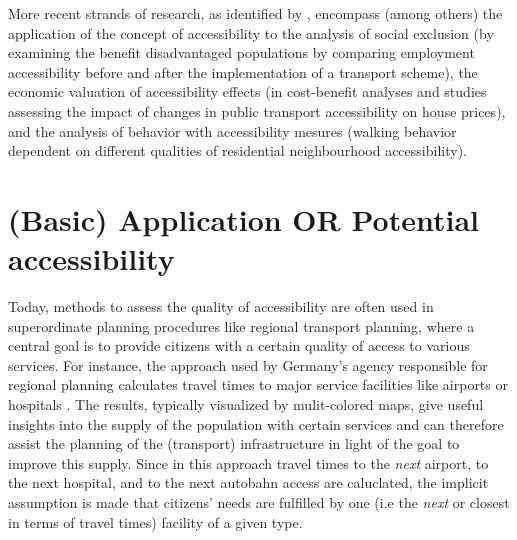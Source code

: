 More recent strands of research, as identified by \citet{GeursEtAl2012AccessibilityTransportIntroduction}, encompass (among others) the application of the concept of accessibility to the analysis of social exclusion (\eg by examining the benefit disadvantaged populations by comparing employment accessibility before and after the implementation of a transport scheme), the economic valuation of accessibility effects (\eg in cost-benefit analyses and studies assessing the impact of changes in public transport accessibility on house prices), and the analysis of behavior with accessibility mesures (\eg walking behavior dependent on different qualities of residential neighbourhood accessibility). 


\section{(Basic) Application OR Potential accessibility}
Today, methods to assess the quality of accessibility
are often used in superordinate planning procedures like regional transport planning, where a central goal is to provide citizens with a certain quality of access to various services. For instance, the approach used by Germany's agency responsible for regional planning calculates travel times to major service facilities like airports or hospitals \citep{BBSR20xxErreichbarkeitsmodell}. %
The results, typically visualized by mulit-colored maps, give useful insights into the supply of the population with certain services and can therefore assist the planning of the (transport) infrastructure in light of the goal to improve this supply. Since in this approach travel times to the \textit{next} airport, to the next hospital, and to the next autobahn access are caluclated, the implicit assumption is made that citizens' needs are fulfilled by one (i.e the \textit{next} or closest in terms of travel times) facility of a given type. 

